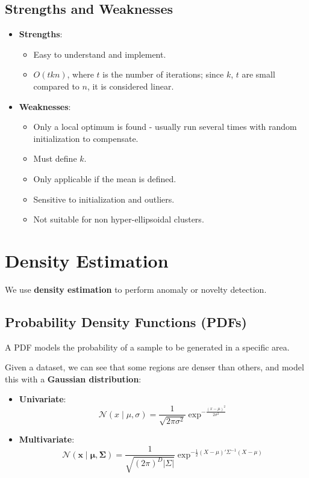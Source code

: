 \documentclass[11pt]{article}
\begin{document}
\subsection{Strengths and Weaknesses}
\begin{itemize}
  \item \textbf{Strengths}:
    \begin{itemize}
      \item Easy to understand and implement.
      \item $O(tkn)$, where $t$ is the number of iterations; since $k$, $t$ are small compared to $n$, it is considered linear.
    \end{itemize}
  \item \textbf{Weaknesses}:
    \begin{itemize}
      \item Only a local optimum is found - usually run several times with random initialization to compensate.
      \item Must define $k$.
      \item Only applicable if the mean is defined.
      \item Sensitive to initialization and outliers.
      \item Not suitable for non hyper-ellipsoidal clusters.
    \end{itemize}
\end{itemize}

\section{Density Estimation}
We use \textbf{density estimation} to perform anomaly or novelty detection.

\subsection{Probability Density Functions (PDFs)}
A PDF models the probability of a sample to be generated in a specific area.

Given a dataset, we can see that some regions are denser than others, and model this with a \textbf{Gaussian distribution}:
\begin{itemize}
  \item \textbf{Univariate}:
    \[
      \mathcal{N}(x \mid \mu, \sigma) = \frac{1}{\sqrt{2 \pi \sigma^2}}\exp^{-\frac{(x - \mu)^2}{2 \sigma^2}} 
    \]
  \item \textbf{Multivariate}:
    \[
      \mathcal{N}(\bm{x} \mid \bm{\mu}, \bm{\Sigma}) = \frac{1}{\sqrt{(2\pi)^D \lvert \Sigma \rvert}}\exp^{-\frac{1}{2} (X - \mu)' \Sigma^{-1}(X - \mu)}
    \]
\end{itemize}
\end{document}
